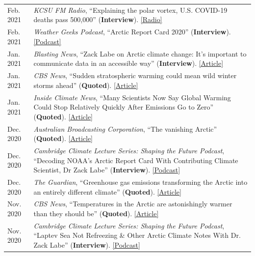 \documentclass[margin,line,palatino,courier,10pt]{res}
\begin{document}
\begin{resume}
\begin{tabular}{@{}p{0.9in}p{4in}}
Feb. 2021 & \textit{KCSU FM Radio}, ``Explaining the polar vortex, U.S. COVID-19 deaths pass 500,000'' (\textbf{Interview}). \href{http://kcsufm.com/2021/02/explaining-the-polar-vortex-u-s-covid-19-deaths-pass-500000/}{[Radio]}\\
Feb. 2021 & \textit{Weather Geeks Podcast}, ``Arctic Report Card 2020'' (\textbf{Interview}). \href{https://podcasts.apple.com/us/podcast/arctic-report-card-2020/id1373312240?i=1000507537964}{[Podcast]}\\
Jan. 2021 & \textit{Blasting News}, ``Zack Labe on Arctic climate change: It's important to communicate data in an accessible way'' (\textbf{Interview}). \href{https://us.blastingnews.com/opinion/2021/01/zack-labe-on-arctic-climate-change-its-important-to-communicate-data-in-an-accessible-way-003267614.html}{[Article]}\\
Jan. 2021 & \textit{CBS News}, ``Sudden stratospheric warming could mean wild winter storms ahead'' (\textbf{Quoted}). \href{https://www.cbsnews.com/news/stratospheric-warming-winter-weather-coming/}{[Article]}\\
Jan. 2021 & \textit{Inside Climate News}, ``Many Scientists Now Say Global Warming Could Stop Relatively Quickly After Emissions Go to Zero'' (\textbf{Quoted}). \href{https://insideclimatenews.org/news/03012021/five-aspects-climate-change-2020/}{[Article]}\\
Dec. 2020 & \textit{Australian Broadcasting Corporation}, ``The vanishing Arctic'' (\textbf{Quoted}). \href{https://www.abc.net.au/news/2020-12-16/arctic-sea-ice-dramatic-transformation-as-seen-by-satellites/12961584?nw=0}{[Article]}\\
Dec. 2020 & \textit{Cambridge Climate Lecture Series: Shaping the Future Podcast}, ``Decoding NOAA's Arctic Report Card With Contributing Climate Scientist, Dr Zack Labe'' (\textbf{Interview}). \href{https://climateseries.com/climate-change-podcast/80-arctic-report-card-zack-labe}{[Podcast]}\\
Dec. 2020 & \textit{The Guardian}, ``Greenhouse gas emissions transforming the Arctic into an entirely different climate'' (\textbf{Quoted}). \href{https://www.theguardian.com/world/2020/dec/08/arctic-report-climate-crisis-wildfires-ice-loss}{[Article]}\\
Nov. 2020 & \textit{CBS News}, ``Temperatures in the Arctic are astonishingly warmer than they should be'' (\textbf{Quoted}). \href{https://www.cbsnews.com/news/climate-change-arctic-temperatures-warmer/}{[Article]}\\
Nov. 2020 & \textit{Cambridge Climate Lecture Series: Shaping the Future Podcast}, ``Laptev Sea Not Refreezing \& Other Arctic Climate Notes With Dr. Zack Labe'' (\textbf{Interview}). \href{https://climateseries.com/climate-change-podcast/74-dr-zack-labe-arctic-laptev-sea}{[Podcast]}\\

\end{tabular}
\end{resume}
\end{document}
